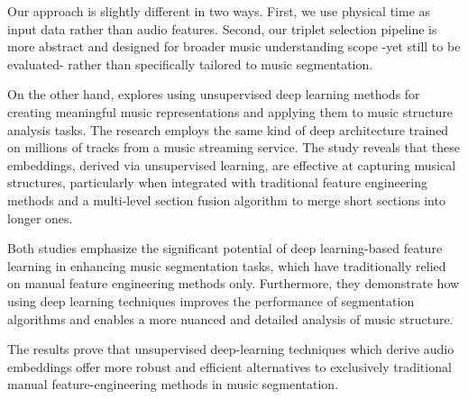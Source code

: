 Our approach is slightly different in two ways. First, we use physical time as input data rather than audio features. Second, our triplet selection pipeline is more abstract and designed for broader music understanding scope -yet still to be evaluated- rather than specifically tailored to music segmentation.

On the other hand, \cite{SalamonDeepSegmentation} explores using unsupervised deep learning methods for creating meaningful music representations and applying them to music structure analysis tasks. The research employs the same kind of deep architecture trained on millions of tracks from a music streaming service. The study reveals that these embeddings, derived via unsupervised learning, are effective at capturing musical structures, particularly when integrated with traditional feature engineering methods and a multi-level section fusion algorithm to merge short sections into longer ones. 

Both studies emphasize the significant potential of deep learning-based feature learning in enhancing music segmentation tasks, which have traditionally relied on manual feature engineering methods only. Furthermore, they demonstrate how using deep learning techniques improves the performance of segmentation algorithms and enables a more nuanced and detailed analysis of music structure. 

The results prove that unsupervised deep-learning techniques which derive audio embeddings offer more robust and efficient alternatives to exclusively traditional manual feature-engineering methods in music segmentation.

